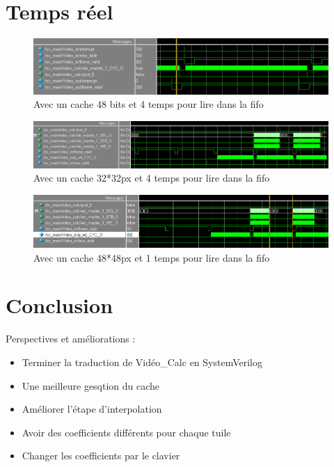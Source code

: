 \documentclass{beamer}
\begin{document}
\section{Temps réel}
\begin{frame}
\begin{figure}[!h]
\centering
\includegraphics[scale = 0.3]{wave_r.png}
\caption{Avec un cache 48 bits et 4 temps pour lire dans la fifo}
\end{figure}
\end{frame}

\begin{frame}
\begin{figure}[!h]
\centering
\includegraphics[scale = 0.3]{wave_cache32_r.png}
\caption{Avec un cache 32*32px et 4 temps pour lire dans la fifo}
\end{figure}
\end{frame}

\begin{frame}
\begin{figure}[!h]
\centering
\includegraphics[scale = 0.3]{wave_sans_wait_r.png}
\caption{Avec un cache 48*48px et 1 temps pour lire dans la fifo}
\end{figure}
\end{frame}

\section{Conclusion}
\centering
{Perspectives et améliorations :
	\begin{itemize}
		\item Terminer la traduction de Vidéo\_Calc en SystemVerilog
		\item Une meilleure gesqtion du cache
		\item Améliorer l'étape d'interpolation
		\item Avoir des coefficients différents pour chaque tuile
		\item Changer les coefficients par le clavier
	\end{itemize}}
\end{document}
